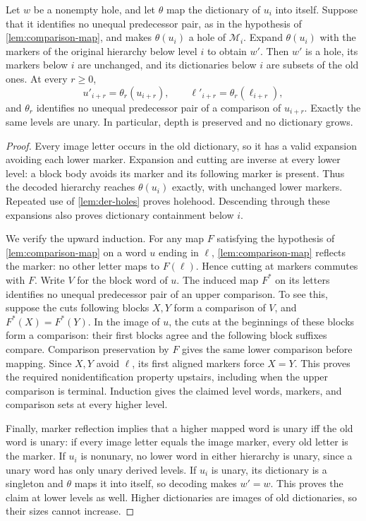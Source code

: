 \begin{lemma}\label{lem:level-maps}
Let $w$ be a nonempty hole, and let $\theta$ map the dictionary of $u_i$ into
itself. Suppose that it identifies no unequal predecessor pair, as in
the hypothesis of \cref{lem:comparison-map}, and makes $\theta(u_i)$ a hole
of $\mathcal M_i$. Expand $\theta(u_i)$ with the
markers of the original hierarchy below level $i$ to obtain $w'$. Then $w'$
is a hole, its markers below $i$ are unchanged, and its dictionaries below
$i$ are subsets of the old ones. At every $r\ge0$,
\[
 u'_{i+r}=\theta_r(u_{i+r}),\qquad
 \ell'_{i+r}=\theta_r(\ell_{i+r}),
\]
and $\theta_r$ identifies no unequal predecessor pair of a comparison of
$u_{i+r}$. Exactly the same levels are unary. In particular, depth is
preserved and no dictionary grows.
\end{lemma}

\begin{proof}
Every image letter occurs in the old dictionary, so it has a valid
expansion avoiding each lower marker. Expansion and cutting are inverse
at every lower level: a block body avoids its marker and its following
marker is present. Thus the decoded hierarchy reaches $\theta(u_i)$ exactly,
with unchanged lower markers. Repeated use of \cref{lem:der-holes} proves
holehood. Descending through these expansions also proves dictionary
containment below $i$.

We verify the upward induction. For any map $F$ satisfying
the hypothesis of \cref{lem:comparison-map} on a word $u$ ending in $\ell$, \cref{lem:comparison-map} reflects the
marker: no other letter maps to $F(\ell)$. Hence cutting at markers
commutes with $F$. Write $V$ for the block word of $u$. The induced
map $F^*$ on its letters identifies no unequal predecessor pair of an
upper comparison. To see this, suppose the cuts following blocks $X,Y$
form a comparison of $V$, and $F^*(X)=F^*(Y)$. In the image of $u$,
the cuts at the beginnings of these blocks form a comparison: their
first blocks agree and the following block suffixes compare.
Comparison preservation by $F$ gives the same lower comparison before
mapping. Since $X,Y$ avoid $\ell$, its first aligned markers force
$X=Y$. This proves the required nonidentification property upstairs,
including when the upper comparison is terminal. Induction gives the
claimed level words, markers, and comparison sets at every higher level.

Finally, marker reflection implies that a higher mapped word is unary
iff the old word is unary: if every image letter equals the image marker,
every old letter is the marker. If $u_i$ is nonunary, no lower word in
either hierarchy is unary, since a unary word has only unary derived
levels. If $u_i$ is unary, its dictionary is a singleton and $\theta$ maps
it into itself, so decoding makes $w'=w$. This proves the claim at
lower levels as well. Higher dictionaries are images of old dictionaries,
so their sizes cannot increase.
\end{proof}


